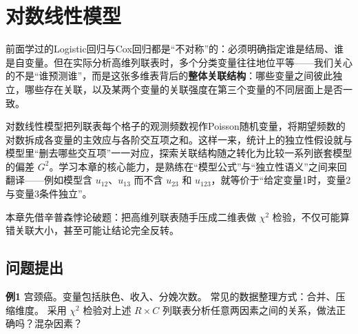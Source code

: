 \chapter{对数线性模型}
前面学过的Logistic回归与Cox回归都是“不对称”的：必须明确指定谁是结局、谁是自变量。但在实际分析高维列联表时，多个分类变量往往地位平等——我们关心的不是“谁预测谁”，而是这张多维表背后的\textbf{整体关联结构}：哪些变量之间彼此独立，哪些存在关联，以及某两个变量的关联强度在第三个变量的不同层面上是否一致。

对数线性模型把列联表每个格子的观测频数视作Poisson随机变量，将期望频数的对数拆成各变量的主效应与各阶交互项之和。这样一来，统计上的独立性假设就与模型里“删去哪些交互项”一一对应，探索关联结构随之转化为比较一系列嵌套模型的偏差 $G^2$。学习本章的核心能力，是熟练在“模型公式”与“独立性语义”之间来回翻译——例如模型含 $u_{12}$、$u_{13}$ 而不含 $u_{23}$ 和 $u_{123}$，就等价于“给定变量1时，变量2与变量3条件独立”。

本章先借辛普森悖论破题：把高维列联表随手压成二维表做 $\chi^2$ 检验，不仅可能算错关联大小，甚至可能让结论完全反转。
\section{问题提出}
\textbf{例1} 宫颈癌。变量包括肤色、收入、分娩次数。
常见的数据整理方式：合并、压缩维度。
采用 $\chi^2$ 检验对上述 $R\times C$ 列联表分析任意两因素之间的关系，做法正确吗？混杂因素？
